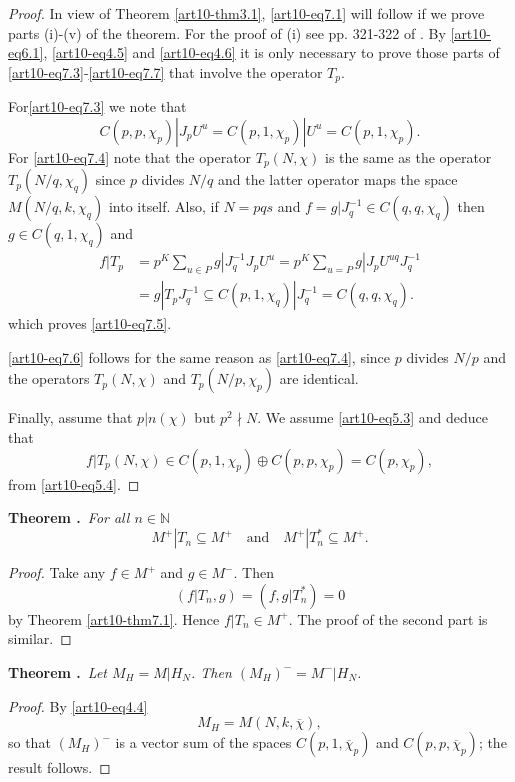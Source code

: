 \begin{proof}
In view of Theorem \ref{art10-thm3.1}, \eqref{art10-eq7.1} will follow if we prove parts (i)-(v) of the theorem. For the proof of (i) see pp. 321-322 of \cite{art10-key}. By \eqref{art10-eq6.1}, \eqref{art10-eq4.5} and \eqref{art10-eq4.6} it is only necessary to prove those parts of \eqref{art10-eq7.3}-\eqref{art10-eq7.7} that involve the operator $T_{p}$.

For\pageoriginale \eqref{art10-eq7.3} we note that
$$
C(p,p,\chi_{p})|J_{p}U^{u}=C(p,1,\chi_{p})|U^{u}=C(p,1,\chi_{p}).
$$
For \eqref{art10-eq7.4} note that the operator $T_{p}(N,\chi)$ is the same as the operator $T_{p}(N/q,\chi_{q})$ since $p$ divides $N/q$ and the latter operator maps the space $M(N/q,k,\chi_{q})$ into itself. Also, if $N=pqs$ and $f=g|J^{-1}_{q}\in C(q,q,\chi_{q})$ then $g\in C(q,1,\chi_{q})$ and 
\begin{align*}
f|T_{p} &= p^{K}\sum\limits_{u\in P}g|J^{-1}_{q}J_{p}U^{u}=p^{K}\sum\limits_{u=P}g|J_{p}U^{uq}J^{-1}_{q}\\[3pt]
&= g|T_{p}J^{-1}_{q}\subseteq C(p,1,\chi_{q})|J^{-1}_{q}=C(q,q,\chi_{q}).
\end{align*}
which proves \eqref{art10-eq7.5}.

\eqref{art10-eq7.6} follows for the same reason as \eqref{art10-eq7.4}, since $p$ divides $N/p$ and the operators $T_{p}(N,\chi)$ and $T_{p}(N/p,\chi_{p})$ are identical.

Finally, assume that $p|n(\chi)$ but $p^{2}\nmid N$. We assume \eqref{art10-eq5.3} and deduce that
$$
f|T_{p}(N,\chi)\in C(p,1,\chi_{p})\oplus C(p,p,\chi_{p})=C(p,\chi_{p}),
$$
from \eqref{art10-eq5.4}.
\end{proof}

\medskip
\noindent
{\bf Theorem .\label{art10-thm7.2}}~{\em For all $n\in \mathbb{N}$}
$$
M^{+}|T_{n}\subseteq M^{+}\text{~~ and~~ } M^{+}|T^{*}_{n}\subseteq M^{+}.
$$

\begin{proof}
Take any $f\in M^{+}$ and $g\in M^{-}$. Then
$$
(f|T_{n},g)=(f,g|T^{*}_{n})=0
$$
by Theorem \ref{art10-thm7.1}. Hence $f|T_{n}\in M^{+}$. The proof of the second part is similar.
\end{proof}

\medskip
\noindent
{\bf Theorem .\label{art10-thm7.3}}~{\em Let $M_{H}=M|H_{N}$. Then $(M_{H})^{-}=M^{-}|H_{N}$.}

\begin{proof}
By \eqref{art10-eq4.4}
$$
M_{H}=M(N,k,\overline{\chi}),
$$
so that $(M_{H})^{-}$ is a vector sum of the spaces $C(p,1,\overline{\chi}_{p})$ and $C(p,p,\overline{\chi}_{p})$; the result follows.
\end{proof}

